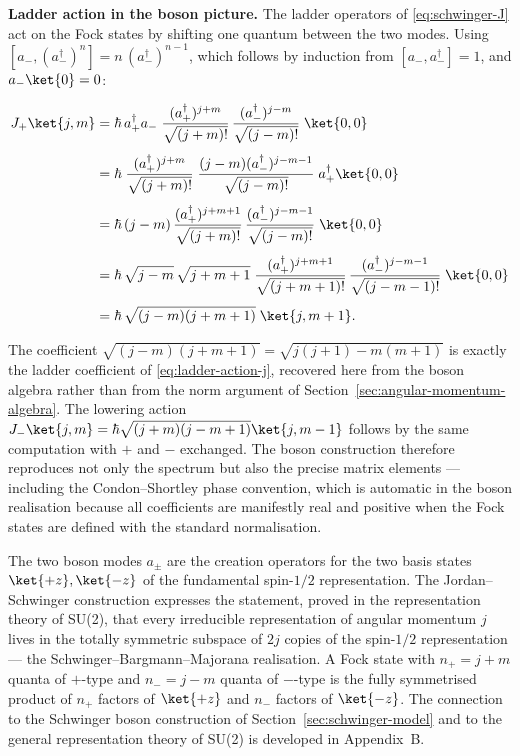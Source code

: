 \medskip\noindent\textbf{Ladder action in the boson picture.}
The ladder operators of \eqref{eq:schwinger-J} act on the Fock states by shifting one quantum between the two modes. Using $[a_-, (a_-^\dagger)^{n}] = n\,(a_-^\dagger)^{n-1}$, which follows by induction from $[a_-, a_-^\dagger] = 1$, and $a_-\ket{0} = 0$:
\begin{linenomath}
  \begin{align*}
    J_+\ket{j,m}
    &= \hbar\,a_+^\dagger a_-\;
       \frac{(a_+^\dagger)^{j+m}}{\sqrt{(j+m)!}}\,
       \frac{(a_-^\dagger)^{j-m}}{\sqrt{(j-m)!}}\;
       \ket{0,0} \\[4pt]
    &= \hbar\;
       \frac{(a_+^\dagger)^{j+m}}{\sqrt{(j+m)!}}\;
       \frac{(j-m)(a_-^\dagger)^{j-m-1}}{\sqrt{(j-m)!}}\;
       a_+^\dagger \ket{0,0} \\[4pt]
    &= \hbar\,(j-m)\,
       \frac{(a_+^\dagger)^{j+m+1}}{\sqrt{(j+m)!}}\,
       \frac{(a_-^\dagger)^{j-m-1}}{\sqrt{(j-m)!}}\;
       \ket{0,0} \\[4pt]
    &= \hbar\,\sqrt{j-m}\,\sqrt{j+m+1}\;
       \frac{(a_+^\dagger)^{j+m+1}}{\sqrt{(j+m+1)!}}\,
       \frac{(a_-^\dagger)^{j-m-1}}{\sqrt{(j-m-1)!}}\;
       \ket{0,0} \\[4pt]
    &= \hbar\,\sqrt{(j-m)(j+m+1)}\;\ket{j,m+1}.
  \end{align*}
\end{linenomath}
The coefficient $\sqrt{(j-m)(j+m+1)} = \sqrt{j(j+1)-m(m+1)}$ is exactly the ladder coefficient of \eqref{eq:ladder-action-j}, recovered here from the boson algebra rather than from the norm argument of Section~\ref{sec:angular-momentum-algebra}. The lowering action $J_-\ket{j,m} = \hbar\sqrt{(j+m)(j-m+1)}\ket{j,m-1}$ follows by the same computation with $+$ and $-$ exchanged. The boson construction therefore reproduces not only the spectrum but also the precise matrix elements --- including the Condon--Shortley phase convention, which is automatic in the boson realisation because all coefficients are manifestly real and positive when the Fock states are defined with the standard normalisation.

\begin{note}
  The two boson modes $a_\pm$ are the creation operators for the two basis states $\ket{+z},\ket{-z}$ of the fundamental spin-$1/2$ representation. The Jordan--Schwinger construction expresses the statement, proved in the representation theory of SU(2), that every irreducible representation of angular momentum $j$ lives in the totally symmetric subspace of $2j$ copies of the spin-$1/2$ representation --- the Schwinger--Bargmann--Majorana realisation. A Fock state with $n_+ = j+m$ quanta of $+$-type and $n_- = j-m$ quanta of $-$-type is the fully symmetrised product of $n_+$ factors of $\ket{+z}$ and $n_-$ factors of $\ket{-z}$. The connection to the Schwinger boson construction of Section~\ref{sec:schwinger-model} and to the general representation theory of SU(2) is developed in Appendix~B.
\end{note}

